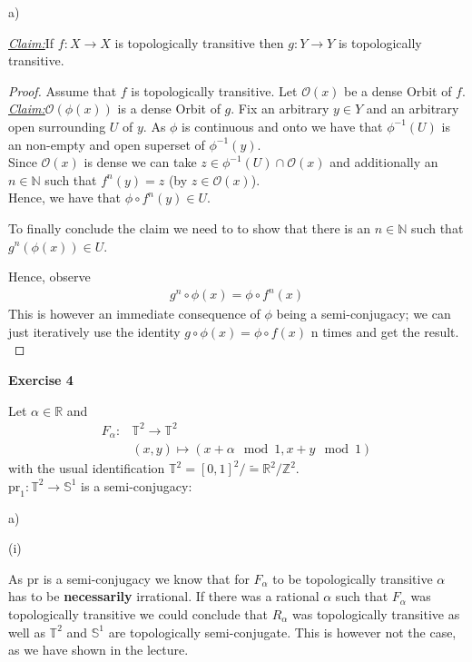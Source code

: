 \documentclass{article}
\newcommand{\claim}{\underline{\textit{Claim:}}\hspace{0,2cm}}
\newcommand{\N}{\mathbb{N}}
\newcommand{\Z}{\mathbb{Z}}
\renewcommand{\S}[1]{\mathbb{S}^{#1}}
\newcommand{\T}[1]{\mathbb{T}^{#1}}
\renewcommand{\O}{\mathcal{O}}
\newcommand{\R}{\mathbb{R}}
\newcommand{\pr}{\mathrm{pr}}
\theoremstyle{definition}
\theoremstyle{plain}
\theoremstyle{remark}
\newcommand{\aufgabe}[1]{
	{
		\vspace*{0.5cm}
		\textsf{\textbf{Exercise #1}}
		\vspace*{0.2cm}

	}
}
\newcommand{\unteraufgabe}[1]{
	{
		\vspace*{0.2cm}
\noindent\textsf{(#1)}
}
}
\newcommand{\teilaufgabe}[1]{
	{
\noindent 
\vspace*{0.2cm}
\hspace*{0,1 cm}
\textsf{#1)}
}
}
\begin{document}
\teilaufgabe{a} 

\claim If $f:X\rightarrow X$ is topologically transitive then $g:Y\rightarrow Y$ is topologically transitive. 
\begin{proof}
	Assume that $f$ is topologically transitive. Let $\O(x)$ be a dense Orbit of $f$. 
	\claim $\O(\phi(x))$ is a dense Orbit of $g$.
	Fix an arbitrary $y\in Y$ and an arbitrary open surrounding $U$ of $y$. As $\phi$ is continuous and onto we have that $\phi^{-1}(U)$ is an non-empty and open superset of $\phi^{-1}(y)$. \\
	Since $\O(x)$ is dense we can take $z\in \phi^{-1}(U)\cap\O(x)$ and additionally an $n\in\N$ such that $f^n(y)=z$ (by $z \in \O(x)$). \\
	Hence, we have that $\phi\circ f^n(y) \in U$.
	\medskip

	To finally conclude the claim we need to to show that there is an $n\in \N$ such that $g^n(\phi(x))\in U$.
	
	Hence, observe 
	\begin{align}
		g^n\circ \phi(x) = \phi \circ f^n(x)
	\end{align}
	This is however an immediate consequence of $\phi$ being a semi-conjugacy; we can just iteratively use the identity $g\circ\phi (x) =\phi\circ f(x)$ n times and get the result. \\
\end{proof}
\aufgabe4 Let $\alpha \in \R$ and 
\begin{align}
	F_{\alpha}:& \T2\rightarrow\T2 \\
		   & (x,y)\mapsto (x+\alpha \mod 1, x+y \mod 1)
\end{align}
with the usual identification $\T2 = [0,1]^2/\tilde = \R^2/\Z^2$. \\
$\mathrm{pr}_1:\T2 \rightarrow \S1$ is a semi-conjugacy:
\begin{figure}[h]
	\centering
{}
\end{figure}

\teilaufgabe{a}

\unteraufgabe{i}

As $\pr$ is a semi-conjugacy we know that for $F_{\alpha}$ to be topologically transitive $\alpha$ has to be \textbf{necessarily} irrational. If there was a rational $\alpha$ such that $F_{\alpha}$ was topologically transitive we could conclude that $R_{\alpha}$ was topologically transitive as well as $\T2$ and $\S1$ are topologically semi-conjugate. 
This is however not the case, as we have shown in the lecture.
\end{document}
